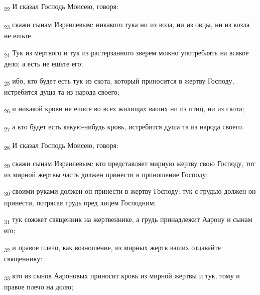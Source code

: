\begin{tcolorbox}
\textsubscript{22} И сказал Господь Моисею, говоря:
\end{tcolorbox}
\begin{tcolorbox}
\textsubscript{23} скажи сынам Израилевым: никакого тука ни из вола, ни из овцы, ни из козла не ешьте.
\end{tcolorbox}
\begin{tcolorbox}
\textsubscript{24} Тук из мертвого и тук из растерзанного зверем можно употреблять на всякое дело; а есть не ешьте его;
\end{tcolorbox}
\begin{tcolorbox}
\textsubscript{25} ибо, кто будет есть тук из скота, который приносится в жертву Господу, истребится душа та из народа своего;
\end{tcolorbox}
\begin{tcolorbox}
\textsubscript{26} и никакой крови не ешьте во всех жилищах ваших ни из птиц, ни из скота;
\end{tcolorbox}
\begin{tcolorbox}
\textsubscript{27} а кто будет есть какую-нибудь кровь, истребится душа та из народа своего.
\end{tcolorbox}
\begin{tcolorbox}
\textsubscript{28} И сказал Господь Моисею, говоря:
\end{tcolorbox}
\begin{tcolorbox}
\textsubscript{29} скажи сынам Израилевым: кто представляет мирную жертву свою Господу, тот из мирной жертвы часть должен принести в приношение Господу;
\end{tcolorbox}
\begin{tcolorbox}
\textsubscript{30} своими руками должен он принести в жертву Господу: тук с грудью должен он принести, потрясая грудь пред лицем Господним;
\end{tcolorbox}
\begin{tcolorbox}
\textsubscript{31} тук сожжет священник на жертвеннике, а грудь принадлежит Аарону и сынам его;
\end{tcolorbox}
\begin{tcolorbox}
\textsubscript{32} и правое плечо, как возношение, из мирных жертв ваших отдавайте священнику:
\end{tcolorbox}
\begin{tcolorbox}
\textsubscript{33} кто из сынов Аароновых приносит кровь из мирной жертвы и тук, тому и правое плечо на долю;
\end{tcolorbox}
